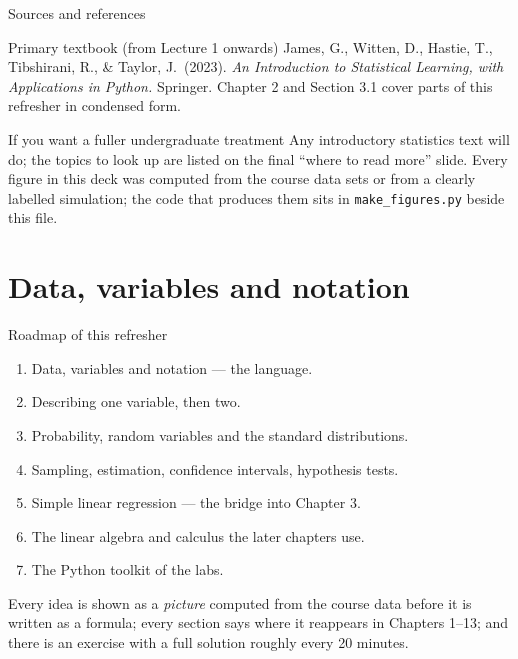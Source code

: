 \documentclass[aspectratio=169,11pt]{beamer}
\begin{document}
\begin{frame}{Sources and references}
  \begin{block}{Primary textbook (from Lecture 1 onwards)}
    James, G., Witten, D., Hastie, T., Tibshirani, R., \& Taylor, J.\ (2023).
    \emph{An Introduction to Statistical Learning, with Applications in
    Python.} Springer. Chapter 2 and Section 3.1 cover parts of this
    refresher in condensed form.
  \end{block}
  \begin{block}{If you want a fuller undergraduate treatment}
    Any introductory statistics text will do; the topics to look up are listed
    on the final ``where to read more'' slide. Every figure in this deck was
    computed from the course data sets or from a clearly labelled simulation;
    the code that produces them sits in \texttt{make\_figures.py} beside this
    file.
  \end{block}
\end{frame}



\section[Data and notation]{Data, variables and notation}

\begin{frame}{Roadmap of this refresher}
  \begin{takeaway}
    \begin{enumerate}
      \item Data, variables and notation --- the language.
      \item Describing one variable, then two.
      \item Probability, random variables and the standard distributions.
      \item Sampling, estimation, confidence intervals, hypothesis tests.
      \item Simple linear regression --- the bridge into Chapter 3.
      \item The linear algebra and calculus the later chapters use.
      \item The Python toolkit of the labs.
    \end{enumerate}
  \end{takeaway}
  \footnotesize
  Every idea is shown as a \emph{picture} computed from the course data before
  it is written as a formula; every section says where it reappears in
  Chapters 1--13; and there is an exercise with a full solution roughly every
  20 minutes.
\end{frame}
\end{document}
